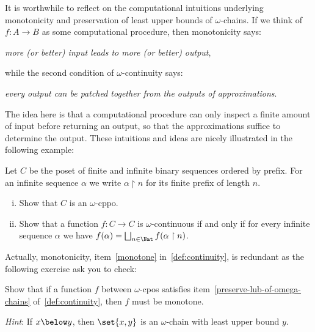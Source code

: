 It is worthwhile to reflect on the computational intuitions underlying
monotonicity and preservation of least upper bounds of \(\omega\)-chains.
%
If we think of \(f \colon A \to B\) as some computational procedure, then
monotonicity says:
\begin{displayquote}
  \emph{more (or better) input leads to more (or better) output},
\end{displayquote}
while the second condition of \(\omega\)-continuity says:
\begin{displayquote}
  \emph{every output can be patched together from the outputs of approximations}.
\end{displayquote}
The idea here is that a computational procedure can only inspect a finite amount
of input before returning an output, so that the approximations suffice to
determine the output.
%
These intuitions and ideas are nicely illustrated in the following example:
\begin{exercise}\label{exer:cantor-domain}
  Let \(C\) be the poset of finite and infinite binary sequences ordered by
  prefix. For an infinite sequence \(\alpha\) we write
  \(\alpha \upharpoonright n\) for its finite prefix of length \(n\).

  \begin{enumerate}[(i)]
  \item Show that \(C\) is an \(\omega\)-cppo.
  \item Show that a function \(f \colon C \to C\) is \(\omega\)-continuous if
    and only if for every infinite sequence \(\alpha\) we have
    \(f(\alpha) = \textstyle\bigsqcup_{n \in \Nat}f(\alpha \upharpoonright n)\). \qedhere
  \end{enumerate}
\end{exercise}


Actually, monotonicity, item~\ref{monotone} in~\cref{def:continuity}, is
redundant as the following exercise ask you to check:

\begin{exercise}\label{exer:monotonicity-follows}
  Show that if a function \(f\) between \(\omega\)-cpos satisfies
  item~\ref{preserve-lub-of-omega-chains} of~\cref{def:continuity}, then \(f\)
  must be monotone.

  \emph{Hint}: If \(x \below y\), then \(\set{x,y}\) is an \(\omega\)-chain with
  least upper bound \(y\).
\end{exercise}

